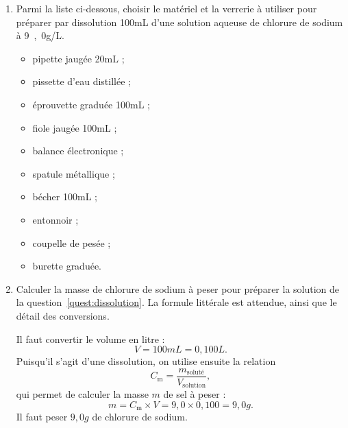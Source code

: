 \begin{enumerate}
\item Parmi la liste ci-dessous, choisir le matériel et la verrerie à utiliser pour préparer par dissolution \unit{100}{mL} d'une solution aqueuse de chlorure de sodium à \unit{9{,}0}{g/L}.
\label{quest:dissolution}
\begin{multicols}{2}
\begin{itemize}
\item[{\color{bleu_f}\xmark}] pipette jaugée \unit{20}{mL} ;
\item[{\color{bleu_f}\cmark}] pissette d'eau distillée ;
\item[{\color{bleu_f}\xmark}] éprouvette graduée \unit{100}{mL} ;
\item[{\color{bleu_f}\cmark}] fiole jaugée \unit{100}{mL} ;
\item[{\color{bleu_f}\cmark}] balance électronique ;
\item[{\color{bleu_f}\cmark}] spatule métallique ;
\item[{\color{bleu_f}\xmark}] bécher \unit{100}{mL} ;
\item[{\color{bleu_f}\cmark}] entonnoir ;
\item[{\color{bleu_f}\cmark}] coupelle de pesée ;
\item[{\color{bleu_f}\xmark}] burette graduée.
\end{itemize}
\end{multicols}

\item Calculer la masse de chlorure de sodium à peser pour préparer la solution de la question~\ref{quest:dissolution}.
La formule littérale est attendue, ainsi que le détail des conversions.

{\color{bleu_f}
Il faut convertir le volume en litre :
\[
V = \unit{100}{mL} = \unit{0{,}100}{L}.
\]
Puisqu'il s'agit d'une dissolution, on utilise ensuite la relation 
\begin{equation}
C_\mathrm{m} = \frac{m_\mathrm{soluté}}{V_\mathrm{solution}},
\nonumber
\end{equation}
qui permet de calculer la masse $m$ de sel à peser :
\[
m = C_\mathrm{m} \times V = 9{,}0 \times 0{,}100 = \unit{9{,}0}{g}.
\]
Il faut peser $\unit{9{,}0}{g}$ de chlorure de sodium.
}
\vfill
\end{enumerate}

